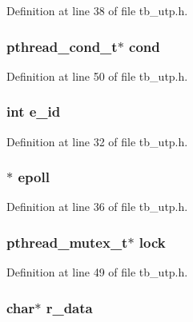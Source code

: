 Definition at line 38 of file tb\-\_\-utp.\-h.

\hypertarget{structtb__utp__t_a41d4de1455ed50839baec9be13941163}{
\subsubsection[{cond}]{\setlength{\rightskip}{0pt plus 5cm}pthread\-\_\-cond\-\_\-t$\ast$ cond}}\label{structtb__utp__t_a41d4de1455ed50839baec9be13941163}


Definition at line 50 of file tb\-\_\-utp.\-h.

\hypertarget{structtb__utp__t_ae2ab59af76be940892170990721a0832}{
\subsubsection[{e\-\_\-id}]{\setlength{\rightskip}{0pt plus 5cm}int e\-\_\-id}}\label{structtb__utp__t_ae2ab59af76be940892170990721a0832}


Definition at line 32 of file tb\-\_\-utp.\-h.

\hypertarget{structtb__utp__t_af7fbbda1b15f6051fb8cead0ada5ce7e}{
\subsubsection[{epoll}]{$\ast$ epoll}}\label{structtb__utp__t_af7fbbda1b15f6051fb8cead0ada5ce7e}


Definition at line 36 of file tb\-\_\-utp.\-h.

\hypertarget{structtb__utp__t_a33586b4184d23f2b8f4df153ec23af13}{
\subsubsection[{lock}]{\setlength{\rightskip}{0pt plus 5cm}pthread\-\_\-mutex\-\_\-t$\ast$ lock}}\label{structtb__utp__t_a33586b4184d23f2b8f4df153ec23af13}


Definition at line 49 of file tb\-\_\-utp.\-h.

\hypertarget{structtb__utp__t_a4298ec565665ee4e72e4b28434546602}{
\subsubsection[{r\-\_\-data}]{\setlength{\rightskip}{0pt plus 5cm}char$\ast$ r\-\_\-data}}\label{structtb__utp__t_a4298ec565665ee4e72e4b28434546602}


